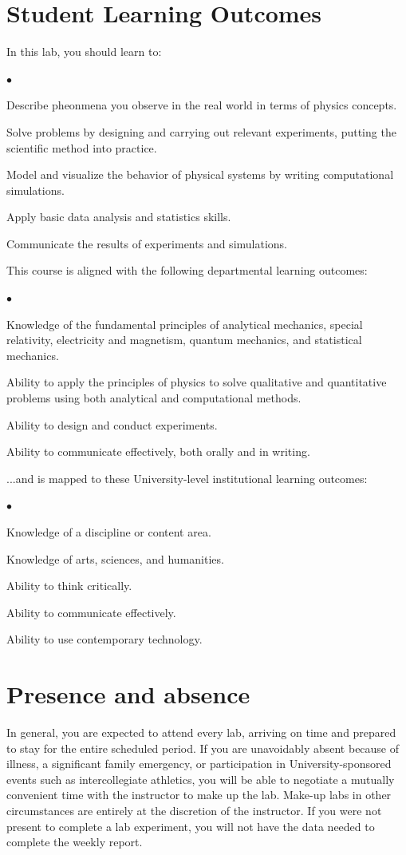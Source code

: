 \documentclass[11pt]{article}
\newcommand{\squishlist}{
   \begin{list}{$\bullet$}
    { \setlength{\itemsep}{0pt}      \setlength{\parsep}{3pt}
      \setlength{\topsep}{3pt}       \setlength{\partopsep}{0pt}
      \setlength{\leftmargin}{1.5em} \setlength{\labelwidth}{1em}
      \setlength{\labelsep}{0.5em} } }
\newcommand{\squishend}{
    \end{list}  }
\begin{document}
\section{Student Learning Outcomes}

In this lab, you should learn to:
\squishlist
\item Describe pheonmena you observe in the real world in terms of physics concepts.
\item Solve problems by designing and carrying out relevant experiments, putting the scientific method into practice.
\item Model and visualize the behavior of physical systems by writing computational simulations.
\item Apply basic data analysis and statistics skills.
\item Communicate the results of experiments and simulations.
\squishend
This course is aligned with the following departmental learning outcomes:
\squishlist
\item Knowledge of the fundamental principles of analytical mechanics, special relativity, electricity and magnetism, quantum mechanics, and statistical mechanics.
\item Ability to apply the principles of physics to solve qualitative and quantitative problems using both analytical and computational methods.
\item Ability to design and conduct experiments.
\item Ability to communicate effectively, both orally and in writing.
\squishend
...and is mapped to these University-level institutional learning outcomes:
\squishlist
\item Knowledge of a discipline or content area.
\item Knowledge of arts, sciences, and humanities.
\item Ability to think critically.
\item Ability to communicate effectively.
\item Ability to use contemporary technology.
\squishend

\section{Presence and absence}

In general, you are expected to attend every lab, arriving on time and prepared to stay for the entire scheduled period.
If you are unavoidably absent because of illness, a significant family emergency, or participation in University-sponsored
events such as intercollegiate athletics, you will be able to negotiate a mutually convenient time with the instructor to make up 
the lab.  Make-up labs in other circumstances are entirely at the discretion of the instructor.  If you were not present to
complete a lab experiment, you will not have the data needed to complete the weekly report.
\end{document}
